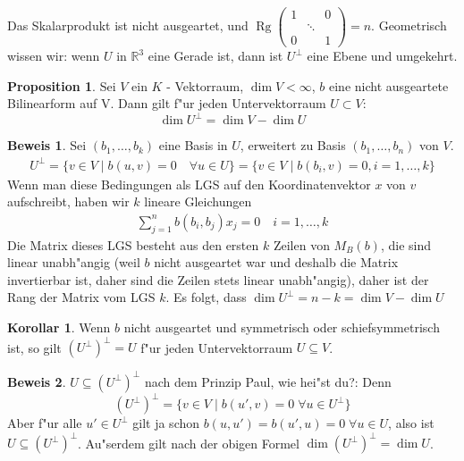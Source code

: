 \documentclass[oneside,fontsize=11pt,paper=a4,BCOR=0mm,DIV=12,automark,headsepline]{scrbook}
\newcommand{\gq}[1]{\glqq{}#1\grqq{}} %
\DeclareMathOperator{\mRg}{Rg}
\theoremstyle{remark}
\theoremstyle{definition}
\newtheorem*{proposition}{Proposition}
\newtheorem*{korollar}{Korollar}
\theoremstyle{definition}
\newtheorem*{prof}{Beweis}
\theoremstyle{remark}
\begin{document}
\begin{exa}
  Das Skalarprodukt ist nicht ausgeartet, und \(\mRg
  \begin{pmatrix}
    1 & & 0 \\
    & \ddots & \\
    0 & & 1
  \end{pmatrix}
  = n\). Geometrisch wissen wir: wenn $U$ in
  $\mathbb{R}^3$ eine Gerade ist, dann ist \(U^\perp\) eine Ebene und umgekehrt.
\end{exa}

\begin{proposition}
  Sei $V$ ein $K$ - Vektorraum, \(\dim V < \infty\), $b$ eine nicht ausgeartete Bilinearform auf V.
  Dann gilt f"ur jeden Untervektorraum \(U\subset V\):
  \[\dim U^\perp = \dim V - \dim U\]
\end{proposition}
\begin{prof}
  Sei \((b_1, \dots, b_k)\) eine Basis in \(U\), erweitert zu Basis \((b_1,\dots, b_n)\) von \(V\).
  \begin{align*}
    U^\perp = \{v\in V \mid b(u, v) = 0\quad \forall u\in U\} = \{v\in V\mid b(b_i, v) = 0, i=1,\dots, k\}
  \end{align*}
  Wenn man diese Bedingungen als LGS auf den Koordinatenvektor \(x\) von \(v\) aufschreibt, haben wir \(k\) lineare Gleichungen
  \begin{align*}
    \sum_{j=1}^nb(b_i, b_j)x_j = 0\quad i = 1,\dots, k
  \end{align*}
  Die Matrix dieses LGS besteht aus den ersten \(k\) Zeilen von \(M_B(b)\), die sind linear unabh"angig (weil \(b\) nicht ausgeartet war und deshalb die Matrix invertierbar ist, daher sind die Zeilen stets linear unabh"angig), daher ist der Rang der Matrix vom LGS \(k\). Es folgt, dass \(\dim U^\perp = n - k = \dim V - \dim U\)
\end{prof}
\begin{korollar}
  Wenn $b$ nicht ausgeartet und symmetrisch oder schiefsymmetrisch ist, so gilt
  $(U^\perp)^\perp = U$ f"ur jeden Untervektorraum $U\subseteq V$.
\end{korollar}
\begin{prof}
  \(U\subseteq (U^\perp)^\perp\) nach dem Prinzip \gq{Paul, wie hei"st du?}: Denn \[(U^\perp)^\perp = \{v\in V \mid b(u', v) = 0\;\forall u\in U^\perp\}\] Aber f"ur alle \(u'\in U^\perp\) gilt ja schon \(b(u, u') = b(u', u) = 0\;\forall u\in U\), also ist \(U\subseteq (U^\perp)^\perp\). Au"serdem gilt nach der obigen Formel \(\dim (U^\perp)^\perp = \dim U\).
\end{prof}
\end{document}
